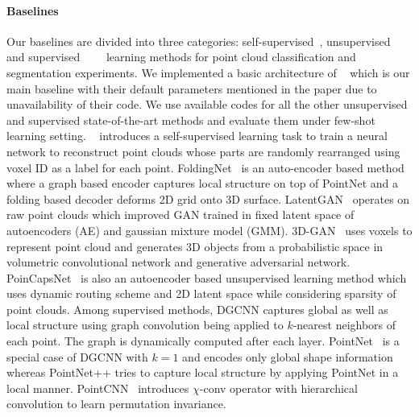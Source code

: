 \documentclass{article}
\begin{document}
\paragraph{Baselines}
Our baselines are divided into three categories: self-supervised~\cite{sauder2019self}, unsupervised~\cite{yang2018foldingnet}~\cite{achlioptas2018learning}~\cite{han2019view} and supervised~\cite{dgcnn}~\cite{qi2017pointnet}~\cite{qi2017pointnet++}~\cite{li2018pointcnn} learning methods for point cloud classification and segmentation experiments.  We implemented a basic architecture of ~\cite{sauder2019self} which is our main baseline with their default parameters mentioned in the paper due to unavailability of their code. We use available codes for all the other unsupervised and supervised state-of-the-art methods and evaluate them under few-shot learning setting. ~\cite{sauder2019self} introduces a self-supervised learning task to train a neural network to reconstruct point clouds whose parts are randomly rearranged using voxel ID as a label for each point. FoldingNet~\cite{yang2018foldingnet} is an auto-encoder based method where a graph based encoder captures local structure on top of PointNet and a folding based decoder deforms 2D grid onto 3D surface. LatentGAN~\cite{achlioptas2018learning} operates on raw point clouds which improved GAN trained in fixed latent space of autoencoders (AE) and gaussian mixture model (GMM). 3D-GAN~\cite{wu2016learning} uses voxels to represent point cloud and generates 3D objects from a probabilistic space in volumetric convolutional network and generative adversarial network. PoinCapsNet~\cite{zhao20193d} is also an autoencoder based unsupervised learning method which uses dynamic routing scheme and 2D latent space while considering sparsity of point clouds. Among supervised methods, DGCNN\cite{dgcnn} captures global as well as local structure using graph convolution being applied to $k$-nearest neighbors of each point. The graph is dynamically computed after each layer. PointNet~\cite{qi2017pointnet} is a special case of DGCNN with $k=1$ and encodes only global shape information whereas PointNet++\cite{qi2017pointnet++} tries to capture local structure by applying PointNet in a local manner. PointCNN~\cite{li2018pointcnn} introduces $\chi$-conv operator with hierarchical convolution to learn permutation invariance. 
\fi
\end{document}
